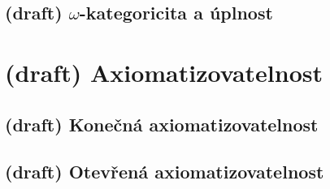 

\subsection{(draft) $\omega$-kategoricita a úplnost}\todo



\section{(draft) Axiomatizovatelnost}\todo



\subsection{(draft) Konečná axiomatizovatelnost}\todo



\subsection{(draft) Otevřená axiomatizovatelnost}\todo


